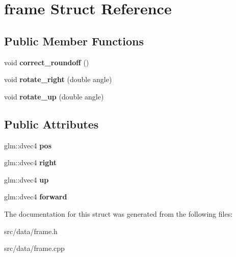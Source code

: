 \hypertarget{structframe}{}\section{frame Struct Reference}
\label{structframe}
\subsection*{Public Member Functions}
\begin{DoxyCompactItemize}
\item 
\hypertarget{structframe_a7ed33c0bced11ae6dd6714b9573d8c14}{}void {\bfseries correct\+\_\+roundoff} ()\label{structframe_a7ed33c0bced11ae6dd6714b9573d8c14}

\item 
\hypertarget{structframe_a3e012d0c926e5b89a466773d5969e3f1}{}void {\bfseries rotate\+\_\+right} (double angle)\label{structframe_a3e012d0c926e5b89a466773d5969e3f1}

\item 
\hypertarget{structframe_ababcd4fdc53cd8d5d609b06129c1bb00}{}void {\bfseries rotate\+\_\+up} (double angle)\label{structframe_ababcd4fdc53cd8d5d609b06129c1bb00}

\end{DoxyCompactItemize}
\subsection*{Public Attributes}
\begin{DoxyCompactItemize}
\item 
\hypertarget{structframe_aaf0d9df38b0be4d266d4b2791453aa6e}{}glm\+::dvec4 {\bfseries pos}\label{structframe_aaf0d9df38b0be4d266d4b2791453aa6e}

\item 
\hypertarget{structframe_a05d89b6b0d5811073ab190ceb99e050d}{}glm\+::dvec4 {\bfseries right}\label{structframe_a05d89b6b0d5811073ab190ceb99e050d}

\item 
\hypertarget{structframe_a0f0a900a4b9bfbcba293e24bf93446ea}{}glm\+::dvec4 {\bfseries up}\label{structframe_a0f0a900a4b9bfbcba293e24bf93446ea}

\item 
\hypertarget{structframe_a6d360eee65dc0764de379784f4e621df}{}glm\+::dvec4 {\bfseries forward}\label{structframe_a6d360eee65dc0764de379784f4e621df}

\end{DoxyCompactItemize}


The documentation for this struct was generated from the following files\+:\begin{DoxyCompactItemize}
\item 
src/data/frame.\+h\item 
src/data/frame.\+cpp\end{DoxyCompactItemize}
